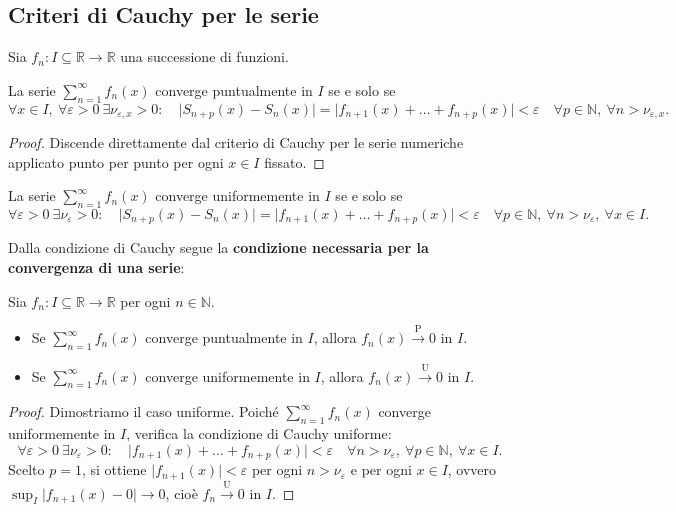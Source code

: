 \subsection{Criteri di Cauchy per le serie}

Sia $f_n : I \subseteq \mathbb{R} \to \mathbb{R}$ una successione di funzioni.\begin{theorem}
La serie $\sum_{n=1}^{\infty} f_n(x)$ converge puntualmente in $I$ se e solo se
$$\forall x \in I, \ \forall \varepsilon > 0 \ \exists \nu_{\varepsilon, x} > 0 : \quad \vert{}S_{n+p}(x) - S_n(x)\vert{} = \vert{}f_{n+1}(x) + \dots + f_{n+p}(x)\vert{} < \varepsilon \quad \forall p \in \mathbb{N}, \ \forall n > \nu_{\varepsilon, x}.$$
\end{theorem}\begin{proof}
Discende direttamente dal criterio di Cauchy per le serie numeriche applicato punto per punto per ogni $x \in I$ fissato.
\end{proof}\begin{theorem}
La serie $\sum_{n=1}^{\infty} f_n(x)$ converge uniformemente in $I$ se e solo se
$$\forall \varepsilon > 0 \ \exists \nu_{\varepsilon} > 0 : \quad \vert{}S_{n+p}(x) - S_n(x)\vert{} = \vert{}f_{n+1}(x) + \dots + f_{n+p}(x)\vert{} < \varepsilon \quad \forall p \in \mathbb{N}, \ \forall n > \nu_{\varepsilon}, \ \forall x \in I.$$
\end{theorem}Dalla condizione di Cauchy segue la \textbf{condizione necessaria per la convergenza di una serie}:\begin{prop}
Sia $f_n : I \subseteq \mathbb{R} \to \mathbb{R}$ per ogni $n \in \mathbb{N}$.
\begin{itemize}
\item Se $\sum_{n=1}^{\infty} f_n(x)$ converge puntualmente in $I$, allora $f_n(x) \xrightarrow{\text{P}} 0$ in $I$.
\item Se $\sum_{n=1}^{\infty} f_n(x)$ converge uniformemente in $I$, allora $f_n(x) \xrightarrow{\text{U}} 0$ in $I$.
\end{itemize}
\end{prop}\begin{proof}
Dimostriamo il caso uniforme. Poiché $\sum_{n=1}^{\infty} f_n(x)$ converge uniformemente in $I$, verifica la condizione di Cauchy uniforme:
$$\forall \varepsilon > 0 \ \exists \nu_{\varepsilon} > 0 : \quad \vert{}f_{n+1}(x) + \dots + f_{n+p}(x)\vert{} < \varepsilon \quad \forall n > \nu_{\varepsilon}, \ \forall p \in \mathbb{N}, \ \forall x \in I.$$
Scelto $p = 1$, si ottiene $\vert{}f_{n+1}(x)\vert{} < \varepsilon$ per ogni $n > \nu_{\varepsilon}$ e per ogni $x \in I$, ovvero $\sup_{I} \vert{}f_{n+1}(x) - 0\vert{} \to 0$, cioè $f_n \xrightarrow{\text{U}} 0$ in $I$.
\end{proof}

